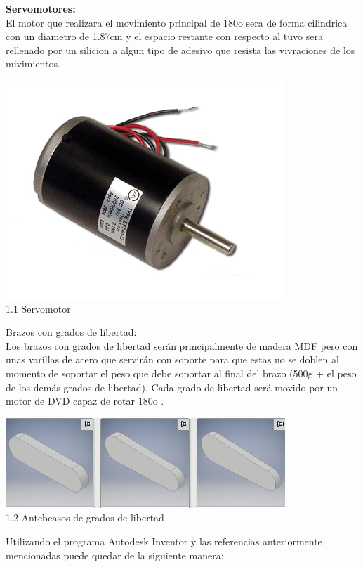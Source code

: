 \documentclass[12pt,a4paper]{article}
\begin{document}
\textbf{Servomotores:}\\
El motor que realizara el movimiento principal de 180o sera de forma cilindrica con un diametro de 1.87cm y el espacio restante con respecto al tuvo sera rellenado por un silicion a algun tipo de adesivo que resista las vivraciones de los mivimientos.\\
\begin{center}
\includegraphics[scale=0.5]{Imagenes/M.png}\\1.1 Servomotor
\end{center}
Brazos con grados de libertad:\\
Los brazos con grados de libertad serán principalmente de madera MDF pero con unas varillas de acero que servirán con soporte para que estas no se doblen al momento de soportar el peso que debe soportar al final del brazo (500g + el peso de los demás grados de libertad). Cada grado de libertad será movido por un motor de DVD capaz de rotar 180o .\\
\begin{center}
\includegraphics[scale=1]{Imagenes/GL.png}\\1.2 Antebeasos de grados de libertad
\end{center}
Utilizando el programa Autodesk Inventor y las referencias anteriormente mencionadas puede quedar de la siguiente manera:\\
\end{document}
